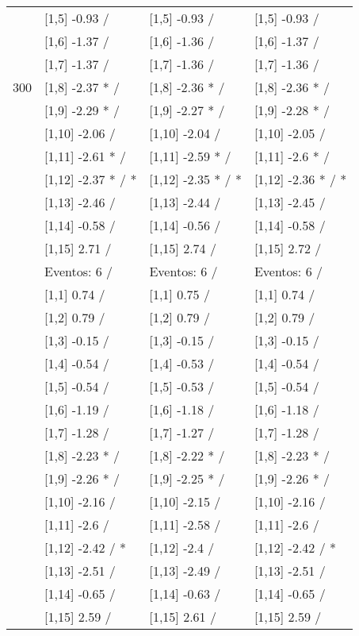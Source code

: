 \begin{table}
\begin{tabular}[t]{llll}
 & {}[1,5] -0.93  / & {}[1,5] -0.93  / & {}[1,5] -0.93  /\\
 & {}[1,6] -1.37  / & {}[1,6] -1.36  / & {}[1,6] -1.37  /\\
 & {}[1,7] -1.37  / & {}[1,7] -1.36  / & {}[1,7] -1.36  /\\
300 & {}[1,8] -2.37 * / & {}[1,8] -2.36 * / & {}[1,8] -2.36 * /\\
\addlinespace
 & {}[1,9] -2.29 * / & {}[1,9] -2.27 * / & {}[1,9] -2.28 * /\\
 & {}[1,10] -2.06  / & {}[1,10] -2.04  / & {}[1,10] -2.05  /\\
 & {}[1,11] -2.61 * / & {}[1,11] -2.59 * / & {}[1,11] -2.6 * /\\
 & {}[1,12] -2.37 * / * & {}[1,12] -2.35 * / * & {}[1,12] -2.36 * / *\\
 & {}[1,13] -2.46  / & {}[1,13] -2.44  / & {}[1,13] -2.45  /\\
\addlinespace
 & {}[1,14] -0.58  / & {}[1,14] -0.56  / & {}[1,14] -0.58  /\\
 & {}[1,15] 2.71  / & {}[1,15] 2.74  / & {}[1,15] 2.72  /\\
 & Eventos:  6 / & Eventos:  6 / & Eventos:  6 /\\
 & {}[1,1] 0.74  / & {}[1,1] 0.75  / & {}[1,1] 0.74  /\\
 & {}[1,2] 0.79  / & {}[1,2] 0.79  / & {}[1,2] 0.79  /\\
\addlinespace
 & {}[1,3] -0.15  / & {}[1,3] -0.15  / & {}[1,3] -0.15  /\\
 & {}[1,4] -0.54  / & {}[1,4] -0.53  / & {}[1,4] -0.54  /\\
 & {}[1,5] -0.54  / & {}[1,5] -0.53  / & {}[1,5] -0.54  /\\
 & {}[1,6] -1.19  / & {}[1,6] -1.18  / & {}[1,6] -1.18  /\\
 & {}[1,7] -1.28  / & {}[1,7] -1.27  / & {}[1,7] -1.28  /\\
\addlinespace
500 & {}[1,8] -2.23 * / & {}[1,8] -2.22 * / & {}[1,8] -2.23 * /\\
 & {}[1,9] -2.26 * / & {}[1,9] -2.25 * / & {}[1,9] -2.26 * /\\
 & {}[1,10] -2.16  / & {}[1,10] -2.15  / & {}[1,10] -2.16  /\\
 & {}[1,11] -2.6  / & {}[1,11] -2.58  / & {}[1,11] -2.6  /\\
 & {}[1,12] -2.42  / * & {}[1,12] -2.4  / & {}[1,12] -2.42  / *\\
\addlinespace
 & {}[1,13] -2.51  / & {}[1,13] -2.49  / & {}[1,13] -2.51  /\\
 & {}[1,14] -0.65  / & {}[1,14] -0.63  / & {}[1,14] -0.65  /\\
 & {}[1,15] 2.59  / & {}[1,15] 2.61  / & {}[1,15] 2.59  /\\
\bottomrule
\end{tabular}
\end{table}
